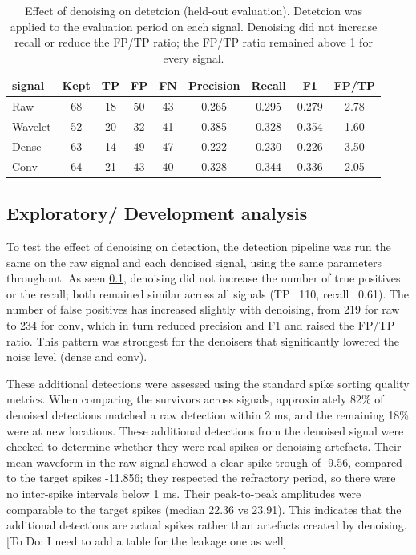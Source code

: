\documentclass[ %
                    author={Daniel Page},
                supervisor={Dr. Andrew Calway},
                    degree={MSc},
                     title={Some Structural Guidelines for Data Science MSc Theses, Including Those With Long Titles that Run Across Multiple Lines on the Front Page},
                  subtitle={And those including an optional subtitle too, for good measure},
                      type={},
                      year={2021}]{dissertation}
\begin{document}
\begin{table}[htbp]
    \centering
    \begin{tabular}{lcccccccc}
    \toprule
    signal & Kept & TP & FP & FN & Precision & Recall & F1 & FP/TP \\
    \midrule
    Raw & 68 & 18 & 50 & 43 & 0.265 & 0.295 & 0.279 & 2.78 \\
    Wavelet & 52 & 20 & 32 & 41 & 0.385 & 0.328 & 0.354 & 1.60 \\
    Dense & 63 & 14 & 49 & 47 & 0.222 & 0.230 & 0.226 & 3.50 \\
    Conv & 64 & 21 & 43 & 40 & 0.328 & 0.344 & 0.336 & 2.05 \\
    \bottomrule
    \end{tabular}
    \caption{Effect of denoising on detetcion (held-out evaluation). Detetcion was applied to the evaluation period on each signal. Denoising did not increase recall or reduce the FP/TP ratio; the FP/TP ratio remained above 1 for every signal.}
    \label{tab:denoising-detetcion-heldout}
\end{table}
\subsection{Exploratory/ Development analysis}
To test the effect of denoising on detection, the detection pipeline was run the same on the raw signal and each denoised signal, using the same parameters throughout. As seen \ref{}, denoising did not increase the number of true positives or the recall; both remained similar across all signals (TP ~110, recall ~0.61). The number of false positives has increased slightly with denoising, from 219 for raw to 234 for conv, which in turn reduced precision and F1 and raised the FP/TP ratio. This pattern was strongest for the denoisers that significantly lowered the noise level (dense and conv). 

These additional detections were assessed using the standard spike sorting quality metrics\cite{hill_quality_2011}. When comparing the survivors across signals, approximately 82\% of denoised detections matched a raw detection within 2 ms, and the remaining 18\% were at new locations.
These additional detections from the denoised signal were checked to determine whether they were real spikes or denoising artefacts. Their mean waveform in the raw signal showed a clear spike trough of -9.56, compared to the target spikes -11.856; they respected the refractory period, so there were no inter-spike intervals below 1 ms. Their peak-to-peak amplitudes were comparable to the target spikes (median 22.36 vs 23.91). This indicates that the additional detections are actual spikes rather than artefacts created by denoising. [To Do: I need to add a table for the leakage one as well]
\end{document}
